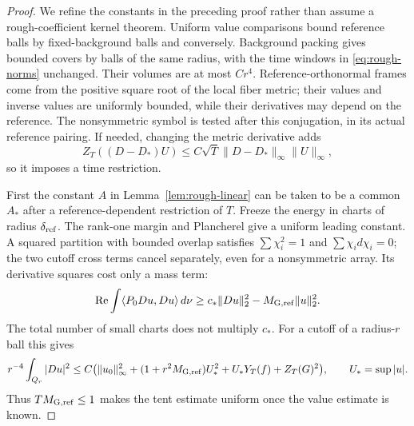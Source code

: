 \documentclass[11pt]{article}
\numberwithin{equation}{section}
\theoremstyle{definition}
\theoremstyle{remark}
\begin{document}
\begin{proof}
We refine the constants in the preceding proof rather than
assume a rough-coefficient kernel theorem. Uniform value
comparisons bound reference balls by fixed-background balls
and conversely. Background packing gives bounded covers by
balls of the same radius, with the time windows in
\eqref{eq:rough-norms} unchanged. Their volumes are at most
\(Cr^4\). Reference-orthonormal frames come from the positive
square root of the local fiber metric; their values and inverse
values are uniformly bounded, while their derivatives may
depend on the reference. The nonsymmetric symbol is tested
after this conjugation, in its actual reference pairing.
If needed, changing the metric derivative adds
\[
 Z_T((D-D_*)U)
 \le C\sqrt T\|D-D_*\|_\infty\|U\|_\infty,
\]
so it imposes a time restriction.

First the constant \(A\) in Lemma~\ref{lem:rough-linear}
can be taken to be a common \(A_*\) after a reference-dependent
restriction of \(T\). Freeze the energy in charts of radius
\(\delta_{\rm ref}\). The rank-one margin and Plancherel give
a uniform leading constant. A squared partition with bounded
overlap satisfies \(\sum\chi_i^2=1\) and
\(\sum\chi_i d\chi_i=0\); the two cutoff cross terms cancel
separately, even for a nonsymmetric array. Its derivative
squares cost only a mass term:
\[
 \operatorname{Re}\int\langle P_0Du,Du\rangle\,d\nu
 \ge c_*\|Du\|_2^2-M_{{\rm G},{\rm ref}}\|u\|_2^2.
\]
The total number of small charts does not multiply \(c_*\).
For a cutoff of a radius-\(r\) ball this gives
\[
 r^{-4}\int_{Q_r}|Du|^2
 \le C\bigl(\|u_0\|_\infty^2+
 (1+r^2M_{{\rm G},{\rm ref}})U_*^2+
 U_*Y_T(f)+Z_T(G)^2\bigr),\qquad U_*=\sup|u|.
\]
Thus \(TM_{{\rm G},{\rm ref}}\le1\) makes the tent estimate
uniform once the value estimate is known.


\end{proof}
\end{document}
